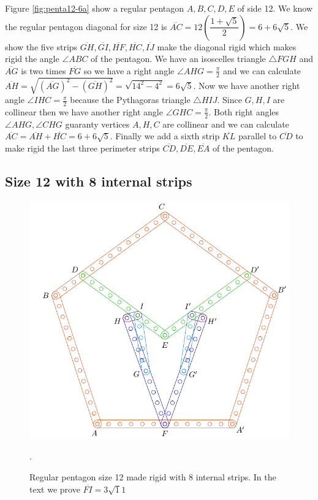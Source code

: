 \documentclass[11pt]{article}
\begin{document}
Figure \ref{fig:penta12-6a} show a regular pentagon $A,B,C,D,E$ of side 12. We know the regular pentagon diagonal for size 12 is $\overline{AC} = 12\left(\dfrac{1+\sqrt5}2\right) = 6 + 6\sqrt5$. We show the five strips $\overline{GH},\overline{GI},\overline{HF},\overline{HC},\overline{IJ}$ make the diagonal rigid which makes rigid the angle $\angle{ABC}$ of the pentagon. We have an isoscelles triangle $\triangle{FGH}$ and $\overline{AG}$ is two times $\overline{FG}$ so we have a right angle $\angle{AHG} = \frac{\pi}2$ and we can calculate $\overline{AH} = \sqrt{(\overline{AG})^2 - (\overline{GH})^2} = \sqrt{14^2-4^2} = 6\sqrt5$. Now we have another right angle $\angle{IHC} = \frac{\pi}2$ because the Pythagoras triangle $\triangle{HIJ}$. Since $G,H,I$ are collinear then we have another right angle $\angle{GHC}=\frac{\pi}2$. Both right angles $\angle{AHG},\angle{CHG}$ guaranty vertices $A,H,C$ are collinear and we can calculate $\overline{AC} = \overline{AH} + \overline{HC} = 6 + 6\sqrt5$. Finally we add a sixth strip $\overline{KL}$ parallel to $\overline{CD}$ to make rigid the last three perimeter strips $\overline{CD},\overline{DE},\overline{EA}$ of the pentagon.

\subsection{Size 12 with 8 internal strips}

\begin{figure}[h]
 \centering
 \includegraphics[scale=0.8]{12/penta12-8a}
 \caption{Regular pentagon size 12 made rigid with 8 internal strips. In the text we prove $\overline{FI} = 3\sqrt11$}.
 \label{fig:penta12-8a}
\end{figure}
\end{document}
